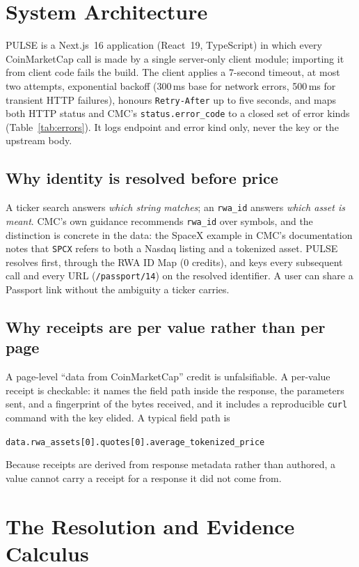 \documentclass[11pt]{article}
\newcommand{\code}[1]{\texttt{\small #1}}
\begin{document}
\section{System Architecture}

\textsc{PULSE} is a Next.js~16 application (React~19, TypeScript) in which every CoinMarketCap call is made by a single server-only client module; importing it from client code fails the build. The client applies a 7-second timeout, at most two attempts, exponential backoff (300\,ms base for network errors, 500\,ms for transient HTTP failures), honours \code{Retry-After} up to five seconds, and maps both HTTP status and CMC's \code{status.error\_code} to a closed set of error kinds (Table~\ref{tab:errors}). It logs endpoint and error kind only, never the key or the upstream body.

\subsection{Why identity is resolved before price}
A ticker search answers \emph{which string matches}; an \code{rwa\_id} answers \emph{which asset is meant}. CMC's own guidance recommends \code{rwa\_id} over symbols, and the distinction is concrete in the data: the SpaceX example in CMC's documentation notes that \code{SPCX} refers to both a Nasdaq listing and a tokenized asset. \textsc{PULSE} resolves first, through the RWA ID Map (0 credits), and keys every subsequent call and every URL (\code{/passport/14}) on the resolved identifier. A user can share a Passport link without the ambiguity a ticker carries.

\subsection{Why receipts are per value rather than per page}
A page-level ``data from CoinMarketCap'' credit is unfalsifiable. A per-value receipt is checkable: it names the field path inside the response, the parameters sent, and a fingerprint of the bytes received, and it includes a reproducible \code{curl} command with the key elided. A typical field path is
\begin{center}\code{data.rwa\_assets[0].quotes[0].average\_tokenized\_price}\end{center}
Because receipts are derived from response metadata rather than authored, a value cannot carry a receipt for a response it did not come from.

\section{The Resolution and Evidence Calculus}
\end{document}
